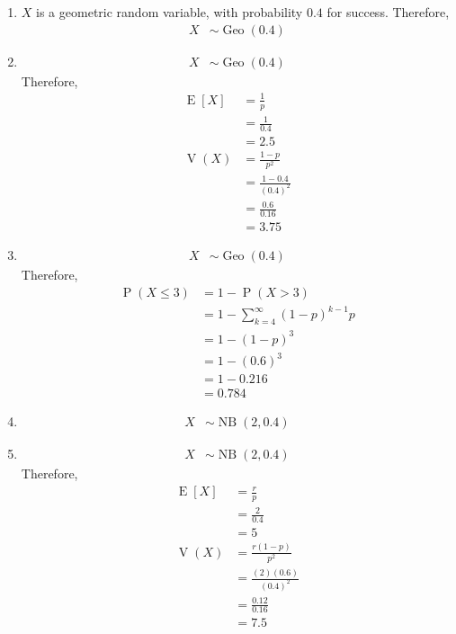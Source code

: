 \documentclass[fleqn, a4paper, 11pt, oneside]{amsart}
\theoremstyle{definition}
\theoremstyle{theorem}
\DeclareMathOperator{\prob}{\mathrm{P}}
\DeclareMathOperator{\expct}{\mathrm{E}}
\DeclareMathOperator{\var}{\mathrm{V}}
\DeclareMathOperator{\geo}{\mathrm{Geo}}
\DeclareMathOperator{\nb}{\mathrm{NB}}
\begin{document}
\begin{solution}
	\begin{enumerate}[leftmargin=*]
		\item
			$X$ is a geometric random variable, with probability $0.4$ for success.
			Therefore,
			\begin{align*}
				X &\sim \geo(0.4)
			\end{align*}
		\item
			\begin{align*}
				X &\sim \geo(0.4)
			\end{align*}
			Therefore,
			\begin{align*}
				\expct[X] &= \frac{1}{p}\\
				&= \frac{1}{0.4}\\
				&= 2.5\\
				\var(X) &= \frac{1 - p}{p^2}\\
				&= \frac{1 - 0.4}{(0.4)^2}\\
				&= \frac{0.6}{0.16}\\
				&= 3.75
			\end{align*}
		\item
			\begin{align*}
				X &\sim \geo(0.4)
			\end{align*}
			Therefore,
			\begin{align*}
				\prob(X \le 3) &= 1 - \prob(X > 3)\\
				&= 1 - \sum\limits_{k = 4}^{\infty} (1 - p)^{k - 1} p\\
				&= 1 - (1 - p)^3\\
				&= 1 - (0.6)^3\\
				&= 1 - 0.216\\
				&= 0.784
			\end{align*}
		\item
			\begin{align*}
				X &\sim \nb(2,0.4)
			\end{align*}
		\item
			\begin{align*}
				X &\sim \nb(2,0.4)
			\end{align*}
			Therefore,
			\begin{align*}
				\expct[X] &= \frac{r}{p}\\
				&= \frac{2}{0.4}\\
				&= 5\\
				\var(X) &= \frac{r (1 - p)}{p^2}\\
				&= \frac{(2) (0.6)}{(0.4)^2}\\
				&= \frac{0.12}{0.16}\\
				&= 7.5
			\end{align*}
	\end{enumerate}
\end{solution}
\end{document}

